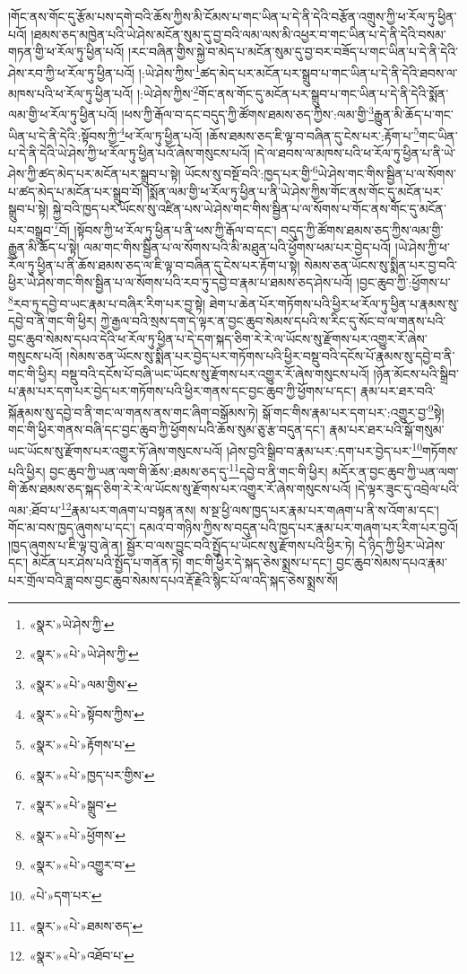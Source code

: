 །གོང་ནས་གོང་དུ་རྩོམ་པས་དགེ་བའི་ཆོས་ཀྱིས་མི་ངོམས་པ་གང་ཡིན་པ་དེ་ནི་དེའི་བརྩོན་འགྲུས་ཀྱི་ཕ་རོལ་ཏུ་ཕྱིན་པའོ། །ཐམས་ཅད་མཁྱེན་པའི་ཡེ་ཤེས་མངོན་སུམ་དུ་བྱ་བའི་ལམ་ལས་མི་འཕྱར་བ་གང་ཡིན་པ་དེ་ནི་དེའི་བསམ་གཏན་གྱི་ཕ་རོལ་ཏུ་ཕྱིན་པའོ། །རང་བཞིན་གྱིས་སྐྱེ་བ་མེད་པ་མངོན་སུམ་དུ་བྱ་བར་བཟོད་པ་གང་ཡིན་པ་དེ་ནི་དེའི་ཤེས་རབ་ཀྱི་ཕ་རོལ་ཏུ་ཕྱིན་པའོ། །:ཡེ་ཤེས་ཀྱིས་\footnote{«སྣར་»ཡེ་ཤེས་ཀྱི་}ཚད་མེད་པར་མངོན་པར་སྒྲུབ་པ་གང་ཡིན་པ་དེ་ནི་དེའི་ཐབས་ལ་མཁས་པའི་ཕ་རོལ་ཏུ་ཕྱིན་པའོ། །:ཡེ་ཤེས་ཀྱིས་\footnote{«སྣར་»«པེ་»ཡེ་ཤེས་ཀྱི་}གོང་ནས་གོང་དུ་མངོན་པར་སྒྲུབ་པ་གང་ཡིན་པ་དེ་ནི་དེའི་སྨོན་ལམ་གྱི་ཕ་རོལ་ཏུ་ཕྱིན་པའོ། །ཕས་ཀྱི་རྒོལ་བ་དང་བདུད་ཀྱི་ཚོགས་ཐམས་ཅད་ཀྱིས་:ལམ་གྱི་\footnote{«སྣར་»«པེ་»ལམ་གྱིས་}རྒྱུན་མི་ཆོད་པ་གང་ཡིན་པ་དེ་ནི་དེའི་:སྟོབས་ཀྱི་\footnote{«སྣར་»«པེ་»སྟོབས་ཀྱིས་}ཕ་རོལ་ཏུ་ཕྱིན་པའོ། །ཆོས་ཐམས་ཅད་ཇི་ལྟ་བ་བཞིན་དུ་ངེས་པར་:རྟོག་པ་\footnote{«སྣར་»«པེ་»རྟོགས་པ་}གང་ཡིན་པ་དེ་ནི་དེའི་ཡེ་ཤེས་ཀྱི་ཕ་རོལ་ཏུ་ཕྱིན་པའོ་ཞེས་གསུངས་པའོ། །དེ་ལ་ཐབས་ལ་མཁས་པའི་ཕ་རོལ་ཏུ་ཕྱིན་པ་ནི་ཡེ་ཤེས་ཀྱི་ཚད་མེད་པར་མངོན་པར་སྒྲུབ་པ་སྟེ། ཡོངས་སུ་བསྔོ་བའི་:ཁྱད་པར་གྱི་\footnote{«སྣར་»«པེ་»ཁྱད་པར་གྱིས་}ཡེ་ཤེས་གང་གིས་སྦྱིན་པ་ལ་སོགས་པ་ཚད་མེད་པ་མངོན་པར་སྒྲུབ་བོ། །སྨོན་ལམ་གྱི་ཕ་རོལ་ཏུ་ཕྱིན་པ་ནི་ཡེ་ཤེས་ཀྱིས་གོང་ནས་གོང་དུ་མངོན་པར་སྒྲུབ་པ་སྟེ། སྐྱེ་བའི་ཁྱད་པར་ཡོངས་སུ་འཛིན་པས་ཡེ་ཤེས་གང་གིས་སྦྱིན་པ་ལ་སོགས་པ་གོང་ནས་གོང་དུ་མངོན་པར་བསྒྲུབ་\footnote{«སྣར་»«པེ་»སྒྲུབ་}བོ། །སྟོབས་ཀྱི་ཕ་རོལ་ཏུ་ཕྱིན་པ་ནི་ཕས་ཀྱི་རྒོལ་བ་དང་། བདུད་ཀྱི་ཚོགས་ཐམས་ཅད་ཀྱིས་ལམ་གྱི་རྒྱུན་མི་ཆོད་པ་སྟེ། ལམ་གང་གིས་སྦྱིན་པ་ལ་སོགས་པའི་མི་མཐུན་པའི་ཕྱོགས་ཕམ་པར་བྱེད་པའོ། །ཡེ་ཤེས་ཀྱི་ཕ་རོལ་ཏུ་ཕྱིན་པ་ནི་ཆོས་ཐམས་ཅད་ལ་ཇི་ལྟ་བ་བཞིན་དུ་ངེས་པར་རྟོག་པ་སྟེ། སེམས་ཅན་ཡོངས་སུ་སྨིན་པར་བྱ་བའི་ཕྱིར་ཡེ་ཤེས་གང་གིས་སྦྱིན་པ་ལ་སོགས་པའི་རབ་ཏུ་དབྱེ་བ་རྣམ་པ་ཐམས་ཅད་ཤེས་པའོ། །བྱང་ཆུབ་ཀྱི་:ཕྱོགས་པ་\footnote{«སྣར་»«པེ་»ཕྱོགས་}རབ་ཏུ་དབྱེ་བ་ཡང་རྣམ་པ་བཞིར་རིག་པར་བྱ་སྟེ། ཐེག་པ་ཆེན་པོར་གཏོགས་པའི་ཕྱིར་ཕ་རོལ་ཏུ་ཕྱིན་པ་རྣམས་སུ་དབྱེ་བ་ནི་གང་གི་ཕྱིར། ཀྱེ་རྒྱལ་བའི་སྲས་དག་དེ་ལྟར་ན་བྱང་ཆུབ་སེམས་དཔའི་ས་རིང་དུ་སོང་བ་ལ་གནས་པའི་བྱང་ཆུབ་སེམས་དཔའ་དེའི་ཕ་རོལ་ཏུ་ཕྱིན་པ་དེ་དག་སྐད་ཅིག་རེ་རེ་ལ་ཡོངས་སུ་རྫོགས་པར་འགྱུར་རོ་ཞེས་གསུངས་པའོ། །སེམས་ཅན་ཡོངས་སུ་སྨིན་པར་བྱེད་པར་གཏོགས་པའི་ཕྱིར་བསྡུ་བའི་དངོས་པོ་རྣམས་སུ་དབྱེ་བ་ནི་གང་གི་ཕྱིར། བསྡུ་བའི་དངོས་པོ་བཞི་ཡང་ཡོངས་སུ་རྫོགས་པར་འགྱུར་རོ་ཞེས་གསུངས་པའོ། །ཉོན་མོངས་པའི་སྒྲིབ་པ་རྣམ་པར་དག་པར་བྱེད་པར་གཏོགས་པའི་ཕྱིར་གནས་དང་བྱང་ཆུབ་ཀྱི་ཕྱོགས་པ་དང་། རྣམ་པར་ཐར་བའི་སྐོརྣམས་སུ་དབྱེ་བ་ནི་གང་ལ་གནས་ནས་གང་ཞིག་བསྒོམས་ཏེ། སྒོ་གང་གིས་རྣམ་པར་དག་པར་:འགྱུར་བྱ་\footnote{«སྣར་»«པེ་»འགྱུར་བ་}སྟེ། གང་གི་ཕྱིར་གནས་བཞི་དང་བྱང་ཆུབ་ཀྱི་ཕྱོགས་པའི་ཆོས་སུམ་ཅུ་རྩ་བདུན་དང་། རྣམ་པར་ཐར་པའི་སྒོ་གསུམ་ཡང་ཡོངས་སུ་རྫོགས་པར་འགྱུར་ཏོ་ཞེས་གསུངས་པའོ། །ཤེས་བྱའི་སྒྲིབ་བ་རྣམ་པར་:དག་པར་བྱེད་པར་\footnote{«པེ་»དག་པར་}གཏོགས་པའི་ཕྱིར། བྱང་ཆུབ་ཀྱི་ཡན་ལག་གི་ཆོས་:ཐམས་ཅད་དུ་\footnote{«སྣར་»«པེ་»ཐམས་ཅད་}དབྱེ་བ་ནི་གང་གི་ཕྱིར། མདོར་ན་བྱང་ཆུབ་ཀྱི་ཡན་ལག་གི་ཆོས་ཐམས་ཅད་སྐད་ཅིག་རེ་རེ་ལ་ཡོངས་སུ་རྫོགས་པར་འགྱུར་རོ་ཞེས་གསུངས་པའོ། །དེ་ལྟར་ཟུང་དུ་འབྲེལ་པའི་ལམ་:ཐོབ་པ་\footnote{«སྣར་»«པེ་»འཐོབ་པ་}རྣམ་པར་གཞག་པ་བསྟན་ནས། ས་སྔ་ཕྱི་ལས་ཁྱད་པར་རྣམ་པར་གཞག་པ་ནི་ས་འོག་མ་དང་། གོང་མ་བས་ཁྱད་ཞུགས་པ་དང་། དམའ་བ་གཉིས་ཀྱིས་ས་བདུན་པའི་ཁྱད་པར་རྣམ་པར་གཞག་པར་རིག་པར་བྱའོ། །ཁྱད་ཞུགས་པ་ཇི་ལྟ་བུ་ཞེ་ན། སྦྱོར་བ་ལས་བྱུང་བའི་སྤྱོད་པ་ཡོངས་སུ་རྫོགས་པའི་ཕྱིར་ཏེ། དེ་ཉིད་ཀྱི་ཕྱིར་ཡེ་ཤེས་དང་། མངོན་པར་ཤེས་པའི་སྤྱོད་པ་གནོན་ཏེ། གང་གི་ཕྱིར་དེ་སྐད་ཅེས་སྨྲས་པ་དང་། བྱང་ཆུབ་སེམས་དཔའ་རྣམ་པར་གྲོལ་བའི་ཟླ་བས་བྱང་ཆུབ་སེམས་དཔའ་རྡོ་རྗེའི་སྙིང་པོ་ལ་འདི་སྐད་ཅེས་སྨྲས་སོ། 
